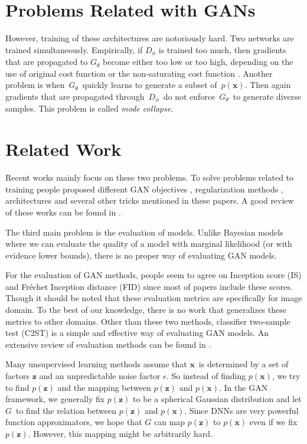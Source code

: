 \documentclass[a4paper,onesided,12pt]{report}
\begin{document}
\section{Problems Related with GANs}
\label{sec:problems}

However, training of these architectures are notoriously hard. Two networks are trained simultaneously. Empirically, if $D_{\phi}$ is trained too much, then gradients that are propagated to $G_{\theta}$ become either too low or too high, depending on the use of original cost function or the non-saturating cost function \cite{principledmethods}. Another problem is when~$G_{\theta}$~quickly learns to generate a subset of~$p(\boldsymbol{x})$. Then again gradients that are propagated through~$D_{\phi}$~do not enforce~$G_{\theta}$~to generate diverse samples. This problem is called \emph{mode collapse}.

\section{Related Work}
\label{sec:related}

Recent works mainly focus on these two problems. To solve problems related to training people proposed different GAN objectives \cite{wgan,infogan,leastgan,lsgan}, regularization methods \cite{improved_wgan,sngan,dcgan}, architectures \cite{biggan,bigan,ali,proggan,stylegan,dcgan,sagan} and several other tricks mentioned in these papers. A good review of these works can be found in \cite{ganreview,ganreview2,ganreview3}.

The third main problem is the evaluation of models. Unlike Bayesian models where we can evaluate the quality of a model with marginal likelihood (or with evidence lower bounds), there is no proper way of evaluating GAN models.

For the evaluation of GAN methods, people seem to agree on Inception score (IS) \cite{improvedtechniques} and Fr\'echet Inception distance (FID) \cite{twotimes} since most of papers include these scores. Though it should be noted that these evaluation metrics are specifically for image domain. To the best of our knowledge, there is no work that generalizes these metrics to other domains. Other than these two methods, classifier two-sample test (C2ST) \cite{twosample} is a simple and effective way of evaluating GAN models. An extensive review of evaluation methods can be found in \cite{evalreview}.

Many unsupervised learning methods assume that $\boldsymbol{x}$~is determined by a set of factors $\boldsymbol{z}$ and an unpredictable noise factor $\epsilon$. So instead of finding $p(\boldsymbol{x})$, we try to find $p(\boldsymbol{z})$ and the mapping between $p(\boldsymbol{z})$ and $p(\boldsymbol{x})$. In the GAN framework, we generally fix $p(\boldsymbol{z})$ to be a spherical Gaussian distribution and let $G$~to find the relation between $p(\boldsymbol{z})$ and $p(\boldsymbol{x})$. Since DNNs are very powerful function approximators, we hope that $G$ can map $p(\boldsymbol{z})$ to $p(\boldsymbol{x})$ even if we fix $p(\boldsymbol{z})$. However, this mapping might be arbitrarily hard.
\end{document}
